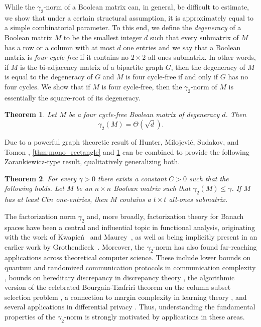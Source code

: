 \documentclass[11pt]{amsart}
\theoremstyle{plain}
\newtheorem{theorem}{Theorem}[section]
\theoremstyle{definition}
\begin{document}
While the $\gamma_2$-norm of a Boolean matrix can, in general, be difficult to estimate, we show that under a certain structural assumption, it is approximately equal to a simple combinatorial parameter. To this end, we define the \emph{degeneracy} of a Boolean matrix $M$ to be the smallest integer $d$ such that every submatrix of $M$ has a row or a column with at most $d$ one entries and we say that a Boolean matrix is \emph{four cycle-free} if it contains no $2\times 2$ all-ones submatrix. In other words, if $M$ is the bi-adjacency matrix of a bipartite graph $G$, then the degeneracy of $M$ is equal to the degeneracy of $G$ and $M$ is four cycle-free if and only if $G$ has no four cycles. %
We show that if $M$ is four cycle-free, then the $\gamma_2$-norm of $M$ is essentially the square-root of its degeneracy. %

\begin{theorem}\label{thm:four_cycle}
Let $M$ be a four cycle-free Boolean matrix of degeneracy $d$. Then $$\gamma_2(M)=\Theta(\sqrt{d}).$$
\end{theorem}

Due to a powerful graph theoretic result of Hunter, Milojevi\'c, Sudakov, and Tomon \cite{HMST0}, \cref{thm:mono_rectangle} and \cref{thm:four_cycle} can be combined to provide the following Zarankiewicz-type result, qualitatively generalizing both.

\begin{theorem}\label{thm:zarankiewicz}
    For every $\gamma>0$ there exists a constant $C >0$ such that the following holds. Let $M$ be an $n\times n$ Boolean matrix such that $\gamma_2(M)\leq \gamma$. If $M$ has at least $Ctn$ one-entries, then $M$ contains a $t\times t$ all-ones submatrix.
\end{theorem}

 The factorization norm $\gamma_2$ and, more broadly, factorization theory for Banach spaces have been a central and influential topic in functional analysis, originating with the work of Kwapie\'n~\cite{kwapien1972operators} and Maurey~\cite{maureytheoremes}, as well as being implicitly present in an earlier work by Grothendieck~\cite{grothendieck1956resume}. Moreover, the $\gamma_2$-norm has also found far-reaching applications across theoretical computer science. These include lower bounds on quantum and randomized communication protocols in communication complexity \cite{LS}, bounds on hereditary discrepancy in discrepancy theory \cite{MNT}, the algorithmic version of the celebrated Bourgain-Tzafriri theorem on the column subset selection problem \cite{tropp2009column}, a connection to margin complexity in learning theory \cite{linial2009learning}, and several applications in differential privacy \cite{muthukrishnan2012optimal, edmonds2020power, fichtenberger2023constant}. Thus, understanding the fundamental properties of the $\gamma_2$-norm is strongly motivated by applications in these areas.
  
\end{document}

